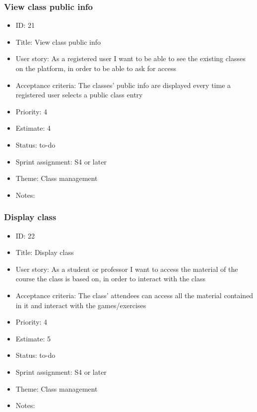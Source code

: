 \subsubsection{View class public info}
\begin{itemize}
	\item ID: 21 
	\item Title: View class public info
	\item User story: As a registered user I want to be able to see the existing classes on the platform, in order to be able to ask for access
	\item Acceptance criteria: The classes' public info are displayed every time a registered user selects a public class entry
	\item Priority: 4
	\item Estimate: 4
	\item Status: to-do
	\item Sprint assignment: S4 or later
	\item Theme: Class management
	\item Notes:
\end{itemize}

\subsubsection{Display class}
\begin{itemize}
	\item ID: 22
	\item Title: Display class
	\item User story: As a student or professor I want to access the material of the course the class is based on, in order to interact with the class
	\item Acceptance criteria: The class' attendees can access all the material contained in it and interact with the games/exercises
	\item Priority: 4
	\item Estimate: 5
	\item Status: to-do
	\item Sprint assignment: S4 or later
	\item Theme: Class management
	\item Notes:
\end{itemize}

